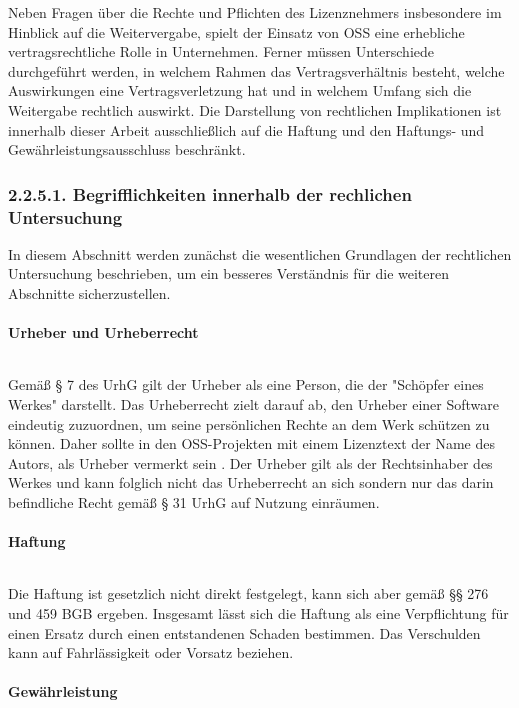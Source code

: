 Neben Fragen über die Rechte und Pflichten des Lizenznehmers insbesondere im Hinblick auf die Weitervergabe, spielt der Einsatz von OSS eine erhebliche vertragsrechtliche Rolle in Unternehmen. Ferner müssen Unterschiede durchgeführt werden, in welchem Rahmen das Vertragsverhältnis besteht, welche Auswirkungen eine Vertragsverletzung hat und in welchem Umfang sich die Weitergabe rechtlich auswirkt. Die Darstellung von rechtlichen Implikationen ist innerhalb dieser Arbeit ausschließlich auf die Haftung und den Haftungs- und Gewährleistungsausschluss beschränkt. 

\subsubsection{2.2.5.1. Begrifflichkeiten innerhalb der rechlichen Untersuchung}

In diesem Abschnitt werden zunächst die wesentlichen Grundlagen der rechtlichen Untersuchung beschrieben, um ein besseres Verständnis für die weiteren Abschnitte sicherzustellen. 

\paragraph{Urheber und Urheberrecht}$~$

Gemäß § 7 des UrhG gilt der Urheber als eine Person, die der "Schöpfer eines Werkes" darstellt. Das Urheberrecht zielt darauf ab, den Urheber einer Software eindeutig zuzuordnen, um seine persönlichen Rechte an dem Werk schützen zu können. Daher sollte in den OSS-Projekten mit einem Lizenztext der Name des Autors, als Urheber vermerkt sein \cite[S. 45]{bitkom_open_2016}.  Der Urheber gilt als der Rechtsinhaber des Werkes und kann folglich nicht das Urheberrecht an sich sondern nur das darin befindliche Recht gemäß § 31 UrhG auf Nutzung einräumen. 

\paragraph{Haftung}$~$

Die Haftung ist gesetzlich nicht direkt festgelegt, kann sich aber gemäß §§ 276 und 459 BGB ergeben. Insgesamt lässt sich die Haftung als eine Verpflichtung für einen Ersatz durch einen entstandenen Schaden bestimmen. Das Verschulden kann auf Fahrlässigkeit oder Vorsatz beziehen. 

\paragraph{Gewährleistung}$~$

